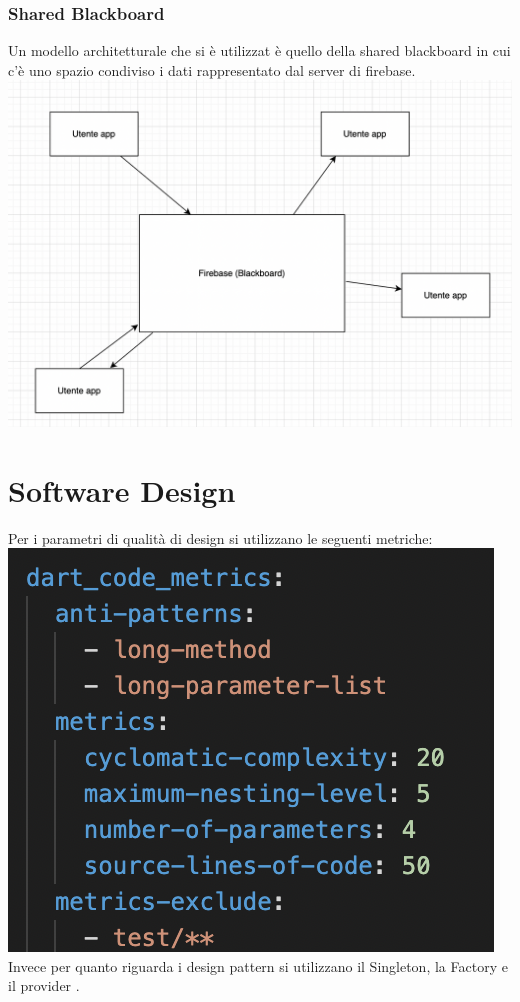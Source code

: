 \documentclass{article}
\begin{document}
\subsubsection{Shared Blackboard}
Un modello architetturale che si è utilizzat è quello della shared blackboard in cui c'è uno spazio condiviso i dati rappresentato 
dal server di firebase.
\\\includegraphics[scale = 0.45]{"Immagini/Blackboard.PNG"}
\newpage
\section{Software Design}
Per i parametri di qualità di design si utilizzano le seguenti metriche:
\\\includegraphics[scale = 0.75]{"Immagini/ParametriQuality.png"}
\\Invece per quanto riguarda i design pattern si utilizzano il Singleton, la Factory e il provider .
\end{document}
